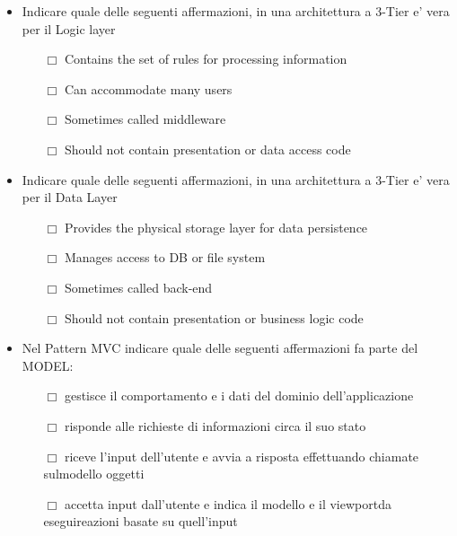 \documentclass[10pt,twocolumn]{article}
\begin{document}
\begin{itemize}
    \item Indicare quale delle seguenti affermazioni, in una architettura a 3-Tier e' vera per il Logic layer
          \begin{itemize}
              \item[$\Box$] Contains the set of rules for processing information
              \item[$\Box$] Can accommodate many users
              \item[$\Box$] Sometimes called middleware
              \item[$\Box$] Should not contain presentation or data access code
          \end{itemize}
\end{itemize}
\begin{itemize}
    \item Indicare quale delle seguenti affermazioni, in una architettura a 3-Tier e' vera per il Data Layer
          \begin{itemize}
              \item[$\Box$] Provides the physical storage layer for data persistence
              \item[$\Box$] Manages access to DB or file system
              \item[$\Box$] Sometimes called back-end
              \item[$\Box$] Should not contain presentation or business logic code
          \end{itemize}
\end{itemize}
\begin{itemize}
    \item Nel Pattern MVC indicare quale delle seguenti affermazioni fa parte del MODEL:
          \begin{itemize}
              \item[$\Box$] gestisce il comportamento e i dati del dominio dell'applicazione
              \item[$\Box$] risponde alle richieste di informazioni circa il suo stato
              \item[$\Box$] riceve l'input dell'utente e avvia a risposta effettuando chiamate sulmodello oggetti
              \item[$\Box$] accetta input dall'utente e indica il modello e il viewportda eseguireazioni basate su quell'input
          \end{itemize}
\end{itemize}
\end{document}
